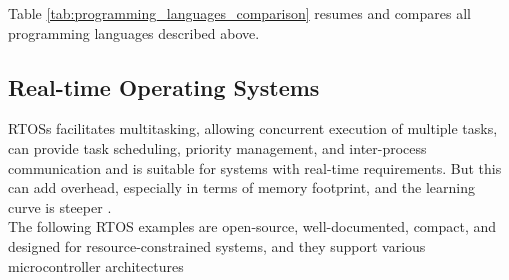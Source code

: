 Table \ref{tab:programming_languages_comparison} resumes and compares all programming languages described above.
\begin{table}[H]
    \centering
    \caption{Comparison of Programming Languages in Embedded Systems}
    \label{tab:programming_languages_comparison}
\end{table}



\subsection{Real-time Operating Systems}
\glspl{RTOS} facilitates multitasking, allowing concurrent execution of multiple tasks, can provide task scheduling, priority management, and inter-process communication and is suitable for systems with real-time requirements.
But this can add overhead, especially in terms of memory footprint, and the learning curve is steeper \cite{RTOS1}.\\
The following \gls{RTOS} examples are open-source, well-documented, compact, and designed for resource-constrained systems, and they support various microcontroller architectures

